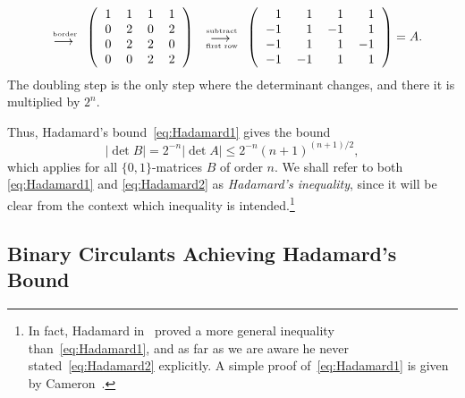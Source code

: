 \[
\begin{tabular}{c}
\begin{tiny}{ border}\end{tiny}\\[-5pt]
$\longrightarrow$
\end{tabular}
\left(\begin{tabular}{rrrr}
1&1&1&1\\
$0$&$2$&$0$&$2$\\
$0$&$2$&$2$&$0$\\
$0$&$0$&$2$&$2$
\end{tabular}\right)
\begin{tabular}{c}
\begin{tiny}{ subtract}\end{tiny}\\[-5pt]
$\longrightarrow$\\[-7pt]
\begin{tiny}{ first row}\end{tiny}
\end{tabular}
\left(\begin{tabular}{rrrr}
$1$&$1$&$1$&$1$\\
$-1$&$1$&$-1$&$1$\\
$-1$&$1$&$1$&$-1$\\
$-1$&$-1$&$1$&$1$
\end{tabular}\right) = A.
\]
The doubling step is the
only step where the determinant changes, and there it is multiplied
by $2^n$.

Thus, Hadamard's bound~\eqref{eq:Hadamard1} gives the bound
\begin{equation}
|\det B| = 2^{-n}|\det A| \le 2^{-n}(n+1)^{(n+1)/2},	\label{eq:Hadamard2}
\end{equation}
which applies for all $\{0,1\}$-matrices $B$ of order $n$.
We shall refer to both \eqref{eq:Hadamard1} and \eqref{eq:Hadamard2} as
\emph{Hadamard's inequality}, since it will be clear from the context
which inequality is intended.\footnote{In fact, Hadamard 
in~\cite{Hadamard93} proved a more
general inequality than~\eqref{eq:Hadamard1}, and as far as we are aware he
never stated~\eqref{eq:Hadamard2} explicitly.
A simple proof of~\eqref{eq:Hadamard1} is given by Cameron~\cite{Cameron06}.
}

\subsection{Binary Circulants Achieving Hadamard's Bound}

